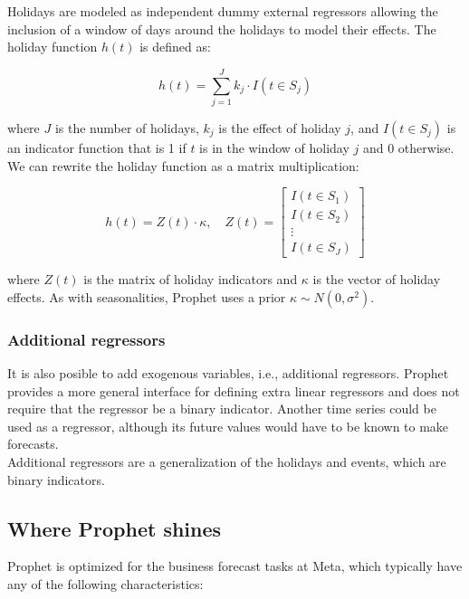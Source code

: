 Holidays are modeled as independent dummy external regressors allowing the inclusion 
of a window of days around the holidays to model their effects. The holiday function
$h(t)$ is defined as:

$$h(t) = \sum_{j=1}^J k_j \cdot I(t \in S_j)$$

where $J$ is the number of holidays, $k_j$ is the effect of holiday $j$, and $I(t \in S_j)$
is an indicator function that is 1 if $t$ is in the window of holiday $j$ and 0 otherwise.
We can rewrite the holiday function as a matrix multiplication:

$$h(t) = Z(t) \cdot \kappa, \quad Z(t) = \begin{bmatrix} I(t \in S_1) \\ I(t \in S_2) \\ \vdots \\ I(t \in S_J) \end{bmatrix}$$

where $Z(t)$ is the matrix of holiday indicators and $\kappa$ is the vector of holiday effects.
As with seasonalities, Prophet uses a prior $\kappa \sim N(0, \sigma^2)$.

\subsubsection{Additional regressors}

It is also posible to add exogenous variables, i.e., additional regressors. Prophet 
provides a more general interface for defining extra linear regressors and does not 
require that the regressor be a binary indicator. Another time series could be used 
as a regressor, although its future values would have to be known to make forecasts.\\

Additional regressors are a generalization of the holidays and events, which are
binary indicators.

\subsection{Where Prophet shines}

Prophet is optimized for the business forecast tasks at Meta, which typically have any
of the following characteristics:

